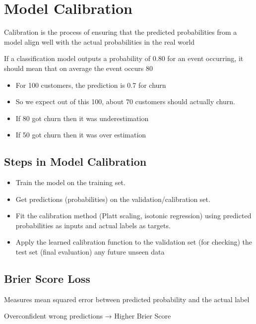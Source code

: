 \documentclass[10pt,a4paper]{article}
\begin{document}
	\section{Model Calibration}

	Calibration is the process of ensuring that the predicted probabilities from a model align well with the actual probabilities in the real world

	If a classification model outputs a probability of 0.80 for an event occurring, it should mean that on average the event occurs 80%

	\begin{itemize}
		\item For 100 customers, the prediction is 0.7 for churn
		\item So we expect out of this 100, about 70 customers should actually churn.
		\item If 80 got churn then it was underestimation
		\item If 50 got churn then it was over estimation
	\end{itemize}

	\subsection{Steps in Model Calibration}

	\begin{itemize}
		\item Train the model on the training set.
		\item Get predictions (probabilities) on the validation/calibration set.
		\item Fit the calibration method (Platt scaling, isotonic regression) using predicted probabilities as inputs and actual labels as targets.
		\item Apply the learned calibration function to the validation set (for checking) the test set (final evaluation) any future unseen data
	\end{itemize}

	\subsection{Brier Score Loss}

	Measures mean squared error between predicted probability and the actual label

	Overconfident wrong predictions → Higher Brier Score
\end{document}
